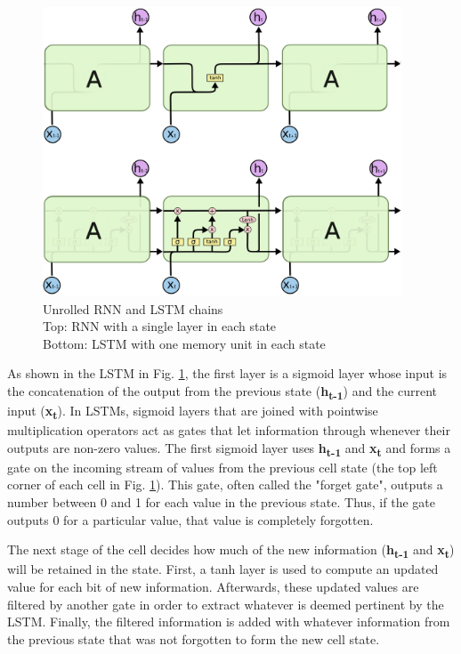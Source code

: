 \begin{figure}[h]
\centering
\captionsetup{justification=centering,width=0.95\textwidth}
\centerline{\includegraphics[width=0.95\textwidth]{rnnChainlstmChain.png}}
\caption[RNN Layer vs LSTM Layer]{
    Unrolled RNN and LSTM chains\\
    Top: RNN with a single layer in each state \cite{rnnChain}\\
    Bottom: LSTM with one memory unit in each state \cite{lstmChain}
}
\label{fig:lstmChain}
\end{figure}

As shown in the LSTM in Fig. \ref{fig:lstmChain}, the first layer is a sigmoid layer whose input is the concatenation of the output from the previous state (\textbf{h\textsubscript{t-1}}) and the current input (\textbf{x\textsubscript{t}}).  In LSTMs, sigmoid layers that are joined with pointwise multiplication operators act as gates that let information through whenever their outputs are non-zero values.  The first sigmoid layer uses \textbf{h\textsubscript{t-1}} and \textbf{x\textsubscript{t}} and forms a gate on the incoming stream of values from the previous cell state (the top left corner of each cell in Fig. \ref{fig:lstmChain}).  This gate, often called the "forget gate", outputs a number between 0 and 1 for each value in the previous state.  Thus, if the gate outputs 0 for a particular value, that value is completely forgotten.

The next stage of the cell decides how much of the new information (\textbf{h\textsubscript{t-1}} and \textbf{x\textsubscript{t}}) will be retained in the state.  First, a tanh layer is used to compute an updated value for each bit of new information.  Afterwards, these updated values are filtered by another gate in order to extract whatever is deemed pertinent by the LSTM.  Finally, the filtered information is added with whatever information from the previous state that was not forgotten to form the new cell state.

